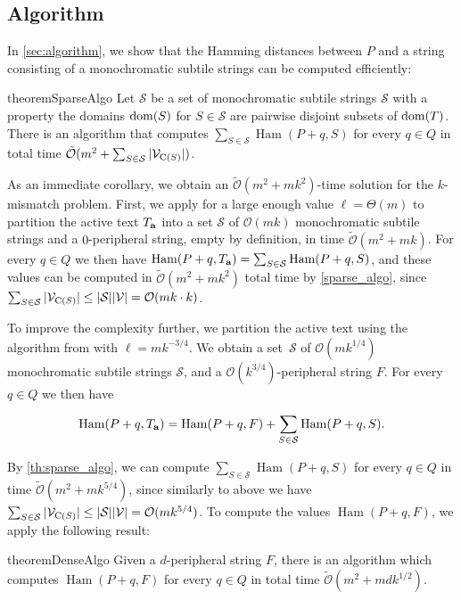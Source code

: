 \documentclass[11pt, letterpaper]{article}
\theoremstyle{plain}
\theoremstyle{definition}
\theoremstyle{remark}
\renewcommand{\O}{\mathcal{O}}
\newcommand{\tO}{\tilde{\mathcal{O}}}
\renewcommand{\S}{\mathcal{S}}
\newcommand{\V}{\mathcal{V}}
\DeclareMathOperator*{\Ham}{Ham}
\begin{document}
\subsection{Algorithm}
In \cref{sec:algorithm}, we show that the Hamming distances between $P$ and a string consisting of a monochromatic subtile strings can be computed efficiently: 

\begin{restatable*}{theorem}{SparseAlgo}
\label{th:sparse_algo}
Let $\S$ be a set of monochromatic subtile strings $\S$ with a property the domains $\operatorname*{dom}(S)$ for $S \in \S$ are pairwise disjoint subsets of $\operatorname*{dom}(T)$. There is an algorithm that computes
$\sum_{S \in \S} \Ham(P + q, S)$ for every $q \in Q$ in total time $\tO(m^2 + \sum_{S \in \S} |\V_{\getchar{S}}|)$.
\end{restatable*}

As an immediate corollary, we obtain an $\tO(m^2 + mk^2)$-time solution for the $k$-mismatch problem. First, we apply  for a large enough value $\ell = \Theta(m)$ to partition the active text $T_\mathbf{a}$ into a set $\S$ of $\O(mk)$ monochromatic subtile strings and a $0$-peripheral string, empty by definition, in time $\tO(m^2 + mk)$. For every $q \in Q$ we then have $\Ham(P + q, \Ta) = \sum_{S \in \S} \Ham(P + q, S)$, and these values can be computed in $\tO(m^2 + mk^{2})$ total time by \cref{sparse_algo}, since $\sum_{S \in \S} |\V_{\getchar{S}}| \le |\S| |\V| = \O(mk \cdot k)$. 

To improve the complexity further, we partition the active text using the algorithm from  with $\ell = mk^{-3/4}$.
We obtain a set~$\S$ of $\O(mk^{1/4})$ monochromatic subtile strings $\S$, and a $\O(k^{3 / 4})$-peripheral string $F$. For every $q \in Q$ we then have

\[ \Ham(P + q, \Ta) = \Ham(P + q, F) + \sum_{S \in \S} \Ham(P + q, S).\]

By \cref{th:sparse_algo}, we can compute $\sum_{S \in \S} \Ham(P + q, S)$ for every $q \in Q$ in time $\tO(m^2 + mk^{5/4})$, since similarly to above we have $\sum_{S \in \S} |\V_{\getchar{S}}| \le |\S| |\V| = \O(mk^{5/4})$. To compute the values $\Ham(P + q, F)$, we apply the following result:

\begin{restatable*}{theorem}{DenseAlgo}
\label{th:dense_algo}
Given a $d$-peripheral string $F$, there is an algorithm which computes $\Ham(P + q, F)$ for every $q \in Q$ in total time $\tO(m^2 + mdk^{1/2})$.
\end{restatable*}
\end{document}
